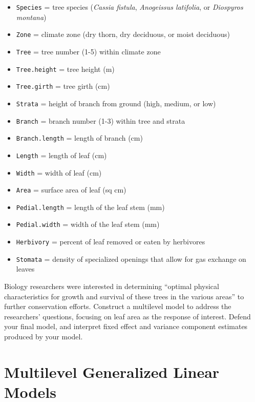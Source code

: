 \documentclass[
]{krantz}
\providecommand{\tightlist}{%
  \setlength{\itemsep}{0pt}\setlength{\parskip}{0pt}}
\begin{document}
\begin{enumerate}
  \begin{itemize}
  \tightlist
  \item
    \texttt{Species} = tree species (\emph{Cassia fistula}, \emph{Anogeissus latifolia}, or \emph{Diospyros montana})
  \item
    \texttt{Zone} = climate zone (dry thorn, dry deciduous, or moist deciduous)
  \item
    \texttt{Tree} = tree number (1-5) within climate zone
  \item
    \texttt{Tree.height} = tree height (m)
  \item
    \texttt{Tree.girth} = tree girth (cm)
  \item
    \texttt{Strata} = height of branch from ground (high, medium, or low)
  \item
    \texttt{Branch} = branch number (1-3) within tree and strata
  \item
    \texttt{Branch.length} = length of branch (cm)
  \item
    \texttt{Length} = length of leaf (cm)
  \item
    \texttt{Width} = width of leaf (cm)
  \item
    \texttt{Area} = surface area of leaf (sq cm)
  \item
    \texttt{Pedial.length} = length of the leaf stem (mm)
  \item
    \texttt{Pedial.width} = width of the leaf stem (mm)
  \item
    \texttt{Herbivory} = percent of leaf removed or eaten by herbivores
  \item
    \texttt{Stomata} = density of specialized openings that allow for gas exchange on leaves
  \end{itemize}

  Biology researchers were interested in determining ``optimal physical characteristics for growth and survival of these trees in the various areas'' to further conservation efforts. Construct a multilevel model to address the researchers' questions, focusing on leaf area as the response of interest. Defend your final model, and interpret fixed effect and variance component estimates produced by your model.
\end{enumerate}

\chapter{Multilevel Generalized Linear Models}\label{ch-GLMM}
\end{document}
